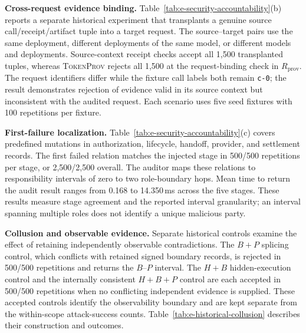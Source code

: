 \noindent\textbf{Cross-request evidence binding.}
Table~\ref{tab:e-security-accountability}(b) reports a separate historical
experiment that transplants a genuine source call/receipt/artifact tuple into
a target request.
The source--target pairs use the same deployment, different deployments of
the same model, or different models and deployments.
Source-context receipt checks accept all 1,500 transplanted tuples, whereas
\textsc{TokenProv} rejects all 1,500 at the request-binding check in
$R_{\mathrm{prov}}$.
The request identifiers differ while the fixture call labels both remain
\texttt{c-0}; the result demonstrates rejection of evidence valid in its source
context but inconsistent with the audited request.
Each scenario uses five seed fixtures with 100 repetitions per fixture.

\noindent\textbf{First-failure localization.}
Table~\ref{tab:e-security-accountability}(c) covers predefined mutations in
authorization, lifecycle, handoff, provider, and settlement records.
The first failed relation matches the injected stage in 500/500 repetitions
per stage, or 2,500/2,500 overall.
The auditor maps these relations to responsibility intervals of zero to two
role-boundary hops.
Mean time to return the audit result ranges from 0.168 to 14.350\,ms across
the five stages.
These results measure stage agreement and the reported interval granularity;
an interval spanning multiple roles does not identify a unique malicious party.

\noindent\textbf{Collusion and observable evidence.}
Separate historical controls examine the effect of retaining independently
observable contradictions.
The $B+P$ splicing control, which conflicts with retained signed boundary
records, is rejected in 500/500 repetitions and returns the $B$--$P$ interval.
The $H+B$ hidden-execution control and the internally consistent $H+B+P$
control are each accepted in 500/500 repetitions when no conflicting
independent evidence is supplied.
These accepted controls identify the observability boundary and are kept
separate from the within-scope attack-success counts.
Table~\ref{tab:e-historical-collusion} describes their construction and outcomes.
